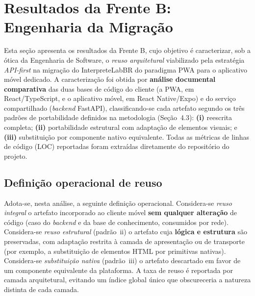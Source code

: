 %   

\section{Resultados da Frente B: Engenharia da Migração}
\label{sec:frente_b}

Esta seção apresenta os resultados da Frente B, cujo objetivo é caracterizar,
sob a ótica da Engenharia de Software, o \emph{reuso arquitetural} viabilizado
pela estratégia \emph{API-first} na migração do InterpreteLabBR do paradigma PWA
para o aplicativo móvel dedicado. A caracterização foi obtida por
\textbf{análise documental comparativa} das duas bases de código do cliente
(a PWA, em React/TypeScript, e o aplicativo móvel, em React Native/Expo) e do
serviço compartilhado (\emph{backend} FastAPI), classificando-se cada artefato
segundo os três padrões de portabilidade definidos na metodologia
(Seção~4.3): \textbf{(i)} reescrita completa; \textbf{(ii)}
portabilidade estrutural com adaptação de elementos visuais; e \textbf{(iii)}
substituição por componente nativo equivalente. Todas as métricas de linhas de
código (LOC) reportadas foram extraídas diretamente do repositório do projeto.

\subsection{Definição operacional de reuso}

Adota-se, nesta análise, a seguinte definição operacional. Considera-se
\emph{reuso integral} o artefato incorporado ao cliente móvel \textbf{sem
qualquer alteração} de código (caso do \emph{backend} e da base de
conhecimento, consumidos por rede). Considera-se \emph{reuso estrutural}
(padrão~ii) o artefato cuja \textbf{lógica e estrutura} são preservadas, com
adaptação restrita à camada de apresentação ou de transporte (por exemplo, a
substituição de elementos HTML por primitivas nativas). Considera-se
\emph{substituição nativa} (padrão~iii) o artefato descartado em favor de um
componente equivalente da plataforma. A taxa de reuso é reportada por camada
arquitetural, evitando um índice global único que obscureceria a natureza
distinta de cada camada.

